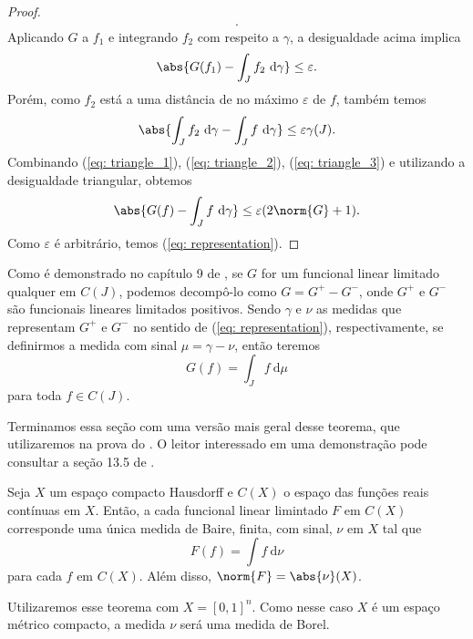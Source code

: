 \begin{proof}
\begin{align*}
    .\end{align*}
    Aplicando \( G \) a \( f_{ 1 } \) e integrando \( f_{ 2 } \) com respeito a \( \gamma \), a desigualdade acima implica
    \begin{equation}
        \abs{ 
            G(f_{ 1 }) - \int_{ J } f_{ 2 } \ \mathrm{d}\gamma
        }
        \leq \varepsilon
        \label{eq: triangle_2}
    .\end{equation}
    Porém, como \( f_{ 2 } \) está a uma distância de no máximo \( \varepsilon \) de \( f \), também temos
    \begin{equation}
        \abs{ 
            \int_{ J } f_{ 2 } \ \mathrm{d}\gamma
            - \int_{ J } f \ \mathrm{d}\gamma
        }
        \leq \varepsilon \gamma(J)
        \label{eq: triangle_3}
    .\end{equation}
    Combinando (\ref{eq: triangle_1}), (\ref{eq: triangle_2}), (\ref{eq: triangle_3}) e utilizando a desigualdade triangular, obtemos \[
        \abs{ G(f) - \int_{ J } f \ \mathrm{d}\gamma }
        \leq \varepsilon (2 \norm{ G } + 1)
    .\]
    Como \( \varepsilon \) é arbitrário, temos (\ref{eq: representation}).
\end{proof}

\begin{rem}
    Como é demonstrado no capítulo 9 de \cite{bartle}, se \( G \) for um funcional linear limitado qualquer em \( C(J) \), podemos decompô-lo como \( G = G^{ + } - G^{ - } \), onde \( G^{ + } \) e \( G^{ - } \) são funcionais lineares limitados positivos.
    Sendo \( \gamma \) e \( \nu \) as medidas que representam \( G^{ + } \) e \( G^{ - } \) no sentido de (\ref{eq: representation}), respectivamente, se definirmos a medida com sinal \( \mu = \gamma - \nu \), então teremos \[
        G(f) = \int_{ J } f \ \mathrm{d}\mu
    \]
    para toda \( f \in C(J) \).
\end{rem}

Terminamos essa seção com uma versão mais geral desse teorema, que utilizaremos na prova do \uat.
O leitor interessado em uma demonstração pode consultar a seção 13.5 de \cite{royden}.

\begin{Riesz}
    Seja \( X \) um espaço compacto Hausdorff e \( C(X) \) o espaço das funções reais contínuas em \( X \).
    Então, a cada funcional linear limintado \( F \) em \( C(X) \) corresponde uma única medida de Baire, finita, com sinal, \( \nu \) em \( X \) tal que \[
        F(f) = \int f \ \mathrm{d}\nu
    \]
    para cada \( f \) em \( C(X) \).
    Além disso, \( \norm{ F } = \abs{ \nu }(X) \).
\end{Riesz}

\begin{rem}
    Utilizaremos esse teorema com \( X = [0, 1]^{ n } \).
    Como nesse caso \( X \) é um espaço métrico compacto, a medida \( \nu \) será uma medida de Borel.
\end{rem}
